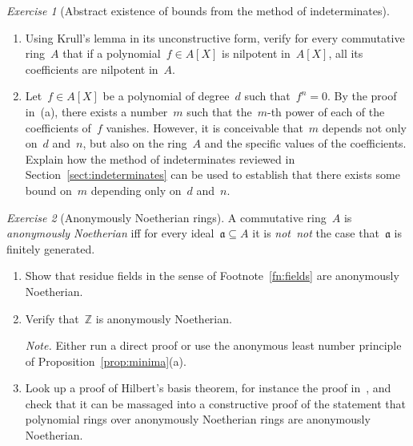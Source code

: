\documentclass[10pt,reqno,a4paper,openany]{amsbook}
\theoremstyle{definition}
\theoremstyle{plain}
\theoremstyle{remark}
\newcommand{\ZZ}{\mathbb{Z}}
\newcommand{\aaa}{\mathfrak{a}}
\newcommand{\?}{\,{:}\,}
\renewcommand{\_}{\mathpunct{.}\,}
\newtheorem{exercise}{Exercise}[chapter]
\newcommand{\notnot}{\emph{not~not}\xspace}
\begin{document}
\begin{exercise}[Abstract existence of bounds from the method of
indeterminates]
\begin{enumerate}
\item Using Krull's lemma in its unconstructive form, verify for every
commutative ring~$A$ that if a polynomial~$f \in A[X]$ is nilpotent in~$A[X]$,
all its coefficients are nilpotent in~$A$.
\item Let~$f \in A[X]$ be a polynomial of degree~$d$ such that~$f^n = 0$.
By the proof in~(a), there exists a number~$m$ such that the~$m$-th power of
each of the coefficients of~$f$ vanishes. However, it is conceivable that~$m$
depends not only on~$d$ and~$n$, but also on the ring~$A$ and the specific
values of the coefficients. Explain how the method of indeterminates reviewed
in Section~\ref{sect:indeterminates} can be used to establish that there exists
some bound on~$m$ depending only on~$d$ and~$n$.
\end{enumerate}
\end{exercise}

\begin{exercise}[Anonymously Noetherian rings]
A commutative ring~$A$ is \emph{anonymously Noetherian} iff for every
ideal~$\aaa \subseteq A$ it is \notnot the case that~$\aaa$ is finitely
generated.
\begin{enumerate}
\item Show that residue fields in the sense of Footnote~\ref{fn:fields} are
anonymously Noetherian.
\item Verify that~$\ZZ$ is anonymously Noetherian.

{\noindent\scriptsize\emph{Note.} Either run a direct proof or use the
anonymous least number principle of Proposition~\ref{prop:minima}(a).\par}
\item Look up a proof of Hilbert's basis theorem, for instance the
proof in~\cite[Theorem~7.5]{atiyah-macdonald:commutative-algebra}, and check
that it can be massaged into a constructive proof of the statement that
polynomial rings over anonymously Noetherian rings are anonymously Noetherian.
\end{enumerate}
\end{exercise}
\end{document}
